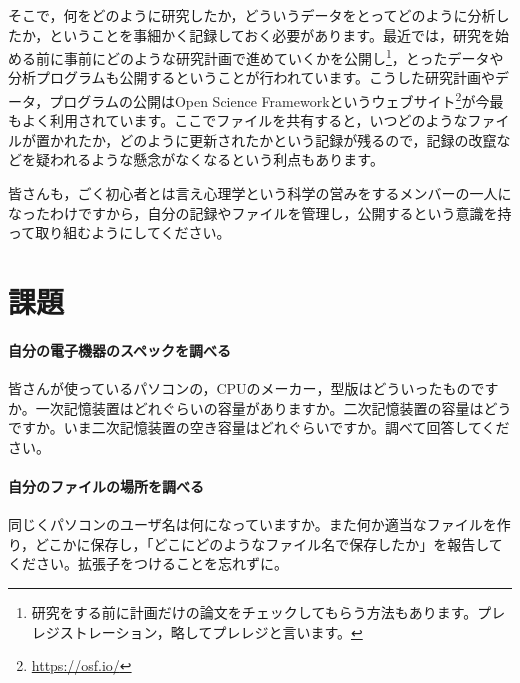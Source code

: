 \documentclass{ltjsbook}
\begin{document}
そこで，何をどのように研究したか，どういうデータをとってどのように分析したか，ということを事細かく記録しておく必要があります。最近では，研究を始める前に事前にどのような研究計画で進めていくかを公開し\footnote{研究をする前に計画だけの論文をチェックしてもらう方法もあります。プレレジストレーション，略してプレレジと言います。}，とったデータや分析プログラムも公開するということが行われています。こうした研究計画やデータ，プログラムの公開はOpen Science Frameworkというウェブサイト\footnote{\url{https://osf.io/}}が今最もよく利用されています。ここでファイルを共有すると，いつどのようなファイルが置かれたか，どのように更新されたかという記録が残るので，記録の改竄などを疑われるような懸念がなくなるという利点もあります。

皆さんも，ごく初心者とは言え心理学という科学の営みをするメンバーの一人になったわけですから，自分の記録やファイルを管理し，公開するという意識を持って取り組むようにしてください。

\section{課題}
\paragraph{自分の電子機器のスペックを調べる}
皆さんが使っているパソコンの，CPUのメーカー，型版はどういったものですか。一次記憶装置はどれぐらいの容量がありますか。二次記憶装置の容量はどうですか。いま二次記憶装置の空き容量はどれぐらいですか。調べて回答してください。
\paragraph{自分のファイルの場所を調べる}
同じくパソコンのユーザ名は何になっていますか。また何か適当なファイルを作り，どこかに保存し，「どこにどのようなファイル名で保存したか」を報告してください。拡張子をつけることを忘れずに。
\end{document}
